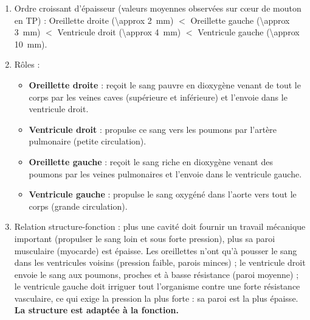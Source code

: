 \documentclass[11pt]{article}
\newcommand{\cle}[1]{{\popxbold\color{popdark}#1}}
\begin{document}
\begin{corrige}
\begin{enumerate}
\item Ordre croissant d'épaisseur (valeurs moyennes observées sur cœur de mouton en TP) :
\cle{Oreillette droite} (\SI{\approx 2}{\milli\meter}) $<$ \cle{Oreillette gauche} (\SI{\approx 3}{\milli\meter}) $<$ \cle{Ventricule droit} (\SI{\approx 4}{\milli\meter}) $<$ \cle{Ventricule gauche} (\SI{\approx 10}{\milli\meter}).
\item Rôles :
\begin{itemize}
\item \textbf{Oreillette droite} : reçoit le sang pauvre en dioxygène venant de tout le corps par les veines caves (supérieure et inférieure) et l'envoie dans le ventricule droit.
\item \textbf{Ventricule droit} : propulse ce sang vers les poumons par l'artère pulmonaire (petite circulation).
\item \textbf{Oreillette gauche} : reçoit le sang riche en dioxygène venant des poumons par les veines pulmonaires et l'envoie dans le ventricule gauche.
\item \textbf{Ventricule gauche} : propulse le sang oxygéné dans l'aorte vers tout le corps (grande circulation).
\end{itemize}
\item Relation structure-fonction : plus une cavité doit fournir un travail mécanique important (propulser le sang loin et sous forte pression), plus sa paroi musculaire (myocarde) est épaisse. Les oreillettes n'ont qu'à pousser le sang dans les ventricules voisins (pression faible, parois minces) ; le ventricule droit envoie le sang aux poumons, proches et à basse résistance (paroi moyenne) ; le ventricule gauche doit irriguer tout l'organisme contre une forte résistance vasculaire, ce qui exige la pression la plus forte : sa paroi est la plus épaisse. \textbf{La structure est adaptée à la fonction.}
\end{enumerate}
\end{corrige}
\end{document}
